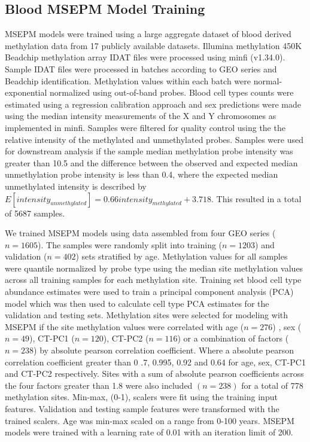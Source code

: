 \documentclass{article}
\begin{document}
{\begin{linenumbers}
\subsection{Blood MSEPM Model Training}
MSEPM models were trained using a large aggregate dataset of blood derived methylation data from 17 publicly available 
datasets\cite{Ventham2016-qj,Demetriou2013-wb,Polidoro2013-xv,Johansson2013-of,Arloth2020-lo,Liu2013-dg,Soriano-Tarraga2016-uq,Chuang2017-nk,
Zannas2019-me,Kurushima2019-pe,Voisin2015-lh,Tan2014-sg,Tserel2015-ro,Butcher2017-oz,Dabin2020-iw,Marabita2013-cj,ValleG2019-xi}. 
Illumina methylation 450K Beadchip methylation array IDAT files were processed using minfi\cite{Aryee2014-ky} (v1.34.0). 
Sample IDAT files were processed in batches according to GEO series and Beadchip  identification. Methylation values within 
each batch were normal-exponential normalized using out-of-band probes\cite{Triche2013-pp}. Blood cell types counts were estimated 
using a regression calibration approach\cite{Houseman2012-rr} and sex predictions were made using the median intensity measurements
of the X and Y chromosomes as implemented in minfi\cite{Aryee2014-ky}. Samples were filtered for quality control using the the relative 
intensity of the methylated and unmethylated probes. Samples were used for downstream analysis if the sample median 
methylation probe intensity was greater than 10.5 and the difference between the observed and expected median 
unmethylation probe intensity is less than 0.4, where the expected median unmethylated intensity is described by 
$E[intensity_{unmethylated}] = 0.66 intensity_{methylated} + 3.718$. This resulted in a total of 5687 samples. 

We trained MSEPM models using data assembled from four GEO series\cite{Johansson2013-of,Liu2013-dg,Butcher2017-oz,Damaso2020-gd}  ($n=1605$). 
The samples were randomly split into training ($n=1203$) and validation ($n=402$) sets stratified by age. Methylation values for all 
samples were quantile normalized by probe type\cite{Horvath2013-sk} using the median site methylation values across all training samples for each methylation site.
Training set blood cell type abundance estimates were used to train a principal component analysis (PCA) model which was then used to calculate cell 
type PCA estimates for the validation and testing sets. Methylation sites were selected for modeling with MSEPM if the site methylation values were correlated with age ($n=276$) , 
sex ($n=49$), CT-PC1 ($n=120$), CT-PC2 ($n=116$) or a combination of factors ($n=238$) by absolute pearson correlation coefficient. Where a absolute pearson correlation coefficient greater than 0
.7, 0.995, 0.92 and 0.64 for age, sex, CT-PC1 and CT-PC2 respectively. Sites with a sum of absolute pearson coefficients across the four factors greater than 1.8 were also included $(n=238)$ 
for a total of 778 methylation sites. Min-max, (0-1), scalers were fit using the training input features. Validation and testing sample features were transformed with the trained scalers. Age was min-max 
scaled on a range from 0-100 years. MSEPM models were trained with a learning rate of 0.01 with an iteration limit of 200. 


\end{linenumbers}}
\end{document}
